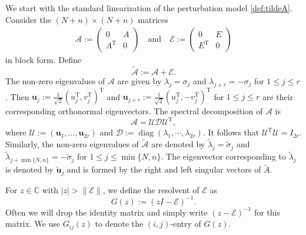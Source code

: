 \documentclass[reqno]{amsart}
\DeclareMathOperator{\diag}{diag}
\newcommand{\T}{\mathrm{T}}
\theoremstyle{plain}
\theoremstyle{definition}
\begin{document}
We start with the standard linearization of the perturbation model \eqref{def:tildeA}. Consider the $(N+n)\times (N+n)$ matrices 
\begin{align*}
\mathcal A := \begin{pmatrix}
0& A\\
A^\T& 0
\end{pmatrix}
\quad\text{and} \quad \mathcal E:=\begin{pmatrix}
0& E\\
E^\T& 0
\end{pmatrix}
\end{align*}
in block form.  
Define
\[ \widetilde{\mathcal A}:=\mathcal A + \mathcal E. \]
The non-zero eigenvalues of $\mathcal A$ are given by $\lambda_j= \sigma_j$ and $\lambda_{j+r} = -\sigma_j$ for $1\le j \le r$. Then $\mathbf u_j:=\frac{1}{\sqrt 2}(u_j^\T, v_j^\T)^\T$  and $\mathbf u_{j+r}:=\frac{1}{\sqrt 2}(u_j^\T, -v_j^\T)^\T$ for $1\le j \le r$ are their corresponding orthonormal eigenvectors. The spectral decomposition of $\mathcal A$ is %
\begin{equation}\label{eq:A}
 \mathcal A = \mathcal{U} \mathcal{D} {\mathcal U}^\T, 
 \end{equation}
where $\mathcal U:=(\mathbf{u}_1,\ldots,\mathbf{u}_{2r})$ and $\mathcal D := \diag(\lambda_1,\cdots, \lambda_{2r})$. It follows that $\mathcal U^\T \mathcal U = I_{2r}$. Similarly, the non-zero eigenvalues  
of $\widetilde{\mathcal A}$ are denoted by $\widetilde\lambda_j=\widetilde\sigma_j$ and  $\widetilde\lambda_{j+\min\{N, n\}}=-\widetilde\sigma_j$ for $1\le j \le \min\{N, n\}$.  The eigenvector corresponding to $\widetilde\lambda_j$ is denoted by $\widetilde{\mathbf{u}}_j$ and is formed by the right and left singular vectors of $\widetilde{A}$.  %

For $z \in \mathbb{C}$ with $|z| > \|\mathcal E\|$, we define the resolvent of $\mathcal E$ as
\[ G(z) := (zI - \mathcal E)^{-1}. \] 
Often we will drop the identity matrix and simply write $(z - \mathcal E)^{-1}$ for this matrix. We use $G_{ij}(z)$ to denote the $(i,j)$-entry of $G(z)$.   
\end{document}
